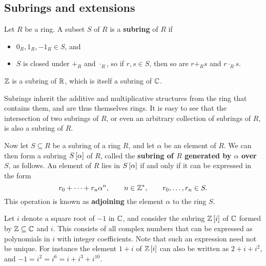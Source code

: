 \pagebreak

\subsection{Subrings and extensions}

\begin{definition}
Let $ R $ be a ring. A subset $ S $ of $ R $ is a \textbf{subring} of $ R $ if
\begin{itemize}
\item $ 0_R, 1_R, -1_R \in S $, and
\item $ S $ is closed under $ +_R $ and $ \cdot_R $, so if $ r, s \in S $, then so are $ r +_R s $ and $ r \cdot_R s $.
\end{itemize}
\end{definition}

\begin{example*}
$ \mathbb{Z} $ is a subring of $ \mathbb{R} $, which is itself a subring of $ \mathbb{C} $.
\end{example*}

Subrings inherit the additive and multiplicative structures from the ring that contains them, and are thus themselves rings. It is easy to see that the intersection of two subrings of $ R $, or even an arbitrary collection of subrings of $ R $, is also a subring of $ R $.

\begin{definition}
Now let $ S \subseteq R $ be a subring of a ring $ R $, and let $ \alpha $ be an element of $ R $. We can then form a subring $ S\sbr{\alpha} $ of $ R $, called the \textbf{subring of $ R $ generated by $ \alpha $ over $ S $}, as follows. An element of $ R $ lies in $ S\sbr{\alpha} $ if and only if it can be expressed in the form
$$ r_0 + \dots + r_n\alpha^n, \qquad n \in \mathbb{Z}^*, \qquad r_0, \dots, r_n \in S. $$
This operation is known as \textbf{adjoining} the element $ \alpha $ to the ring $ S $.
\end{definition}

\begin{example*}
Let $ i $ denote a square root of $ -1 $ in $ \mathbb{C} $, and consider the subring $ \ZZ\sbr{i} $ of $ \mathbb{C} $ formed by $ \mathbb{Z} \subseteq \mathbb{C} $ and $ i $. This consists of all complex numbers that can be expressed as polynomials in $ i $ with integer coefficients. Note that such an expression need not be unique. For instance the element $ 1 + i $ of $ \ZZ\sbr{i} $ can also be written as $ 2 + i + i^2 $, and $ -1 = i^2 = i^6 = i + i^3 + i^{10} $.
\end{example*}

